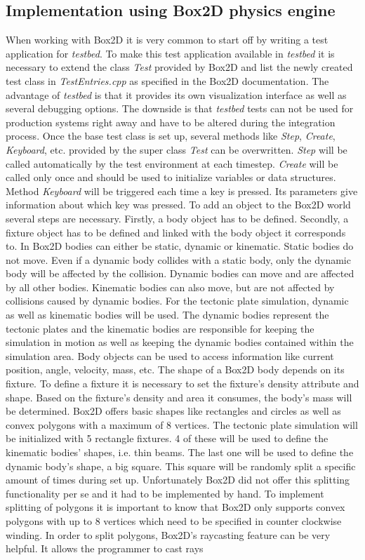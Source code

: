 \documentclass[11pt,a4paper,twoside,openright]{report}
\begin{document}
\subsection{Implementation using Box2D physics engine}
When working with Box2D it is very common to start off by writing a test application for \emph{testbed}. To make this test application available in \emph{testbed} it is necessary to extend the class \emph{Test} provided by Box2D and list the newly created test class in \emph{TestEntries.cpp} as specified in the Box2D documentation. The advantage of \emph{testbed} is that it provides its own visualization interface as well as several debugging options. The downside is that \emph{testbed} tests can not be used for production systems right away and have to be altered during the integration process.
Once the base test class is set up, several methods like \emph{Step}, \emph{Create}, \emph{Keyboard}, etc. provided by the super class \emph{Test} can be overwritten. \emph{Step} will be called automatically by the test environment at each timestep. \emph{Create} will be called only once and should be used to initialize variables or data structures. Method \emph{Keyboard} will be triggered each time a key is pressed. Its parameters give information about which key was pressed. To add an object to the Box2D world several steps are necessary. Firstly, a body object has to be defined. Secondly, a fixture object has to be defined and linked with the body object it corresponds to. In Box2D bodies can either be static, dynamic or kinematic. Static bodies do not move. Even if a dynamic body collides with a static body, only the dynamic body will be affected by the collision. Dynamic bodies can move and are affected by all other bodies. Kinematic bodies can also move, but are not affected by collisions caused by dynamic bodies. For the tectonic plate simulation, dynamic as well as kinematic bodies will be used. The dynamic bodies represent the tectonic plates and the kinematic bodies are responsible for keeping the simulation in motion as well as keeping the dynamic bodies contained within the simulation area. Body objects can be used to access information like current position, angle, velocity, mass, etc. The shape of a Box2D body depends on its fixture. To define a fixture it is necessary to set the fixture's density attribute and shape. Based on the fixture's density and area it consumes, the body's mass will be determined. Box2D offers basic shapes like rectangles and circles as well as convex polygons with a maximum of 8 vertices. The tectonic plate simulation will be initialized with 5 rectangle fixtures. 4 of these will be used to define the kinematic bodies' shapes, i.e. thin beams. The last one will be used to define the dynamic body's shape, a big square. This square will be randomly split a specific amount of times during set up. Unfortunately Box2D did not offer this splitting functionality per se and it had to be implemented by hand. To implement splitting of polygons it is important to know that Box2D only supports convex polygons with up to 8 vertices which need to be specified in counter clockwise winding. In order to split polygons, Box2D's raycasting feature can be very helpful. It allows the programmer to cast rays 
\end{document}
